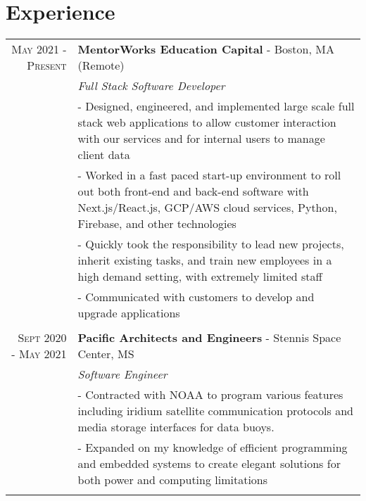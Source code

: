 \documentclass[letterpaper,10pt]{article}
\begin{document}
\section{\textcolor{HeaderColor}{Experience}}
\begin{tabular}{r|p{14cm}}
\textsc{May 2021 - Present} & {\bf MentorWorks Education Capital} - Boston, MA (Remote)
\\&\emph{\textcolor{HeaderColor}{Full Stack Software Developer}}
\\& \small{ - Designed, engineered, and implemented large scale full stack web applications to allow customer interaction with our services and for internal users to manage client data}
\vspace{.1cm}
\\& \small{ - Worked in a fast paced start-up environment to roll out both front-end and back-end software with Next.js/React.js, GCP/AWS cloud services, Python, Firebase, and other technologies }
\vspace{.1cm}
\\& \small{ - Quickly took the responsibility to lead new projects, inherit existing tasks, and train new employees in a high demand setting, with extremely limited staff }
\vspace{.1cm}
\\& \small{ - Communicated with customers to develop and upgrade applications}
\\\multicolumn{2}{c}{} \\

 \textsc{Sept 2020 - May 2021} & {\bf Pacific Architects and Engineers} - Stennis Space Center, MS
 \\&\emph{\textcolor{HeaderColor}{Software Engineer}}\\
 &\small{ - Contracted with NOAA to program various features including iridium satellite communication protocols and media storage interfaces for data buoys.} 
 \vspace{.1cm}
 \\& \small{ - Expanded on my knowledge of efficient programming and embedded systems to create elegant solutions for both power and computing limitations
 }\\\multicolumn{2}{c}{} \\


\end{tabular}
\end{document}
